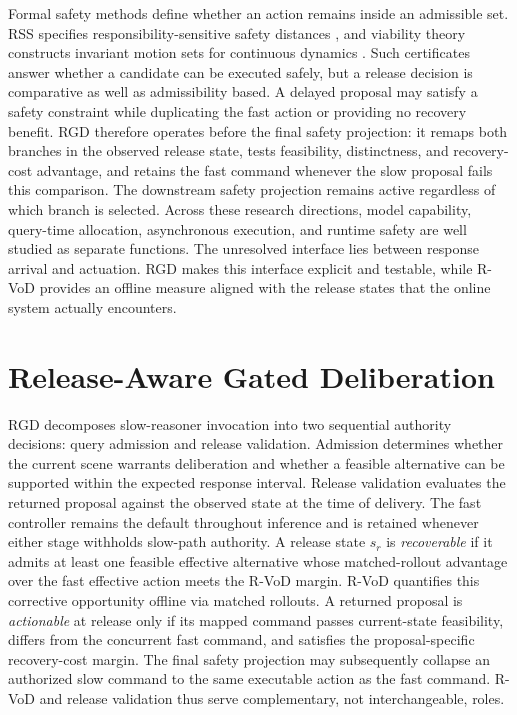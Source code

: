 \documentclass[letterpaper,journal]{IEEEtran}
\begin{document}
Formal safety methods define whether an action remains inside an admissible
set. RSS specifies responsibility-sensitive safety distances
\cite{shalevshwartz2017rss}, and viability theory constructs invariant motion
sets for continuous dynamics \cite{liniger2019viability}. Such certificates
answer whether a candidate can be executed safely, but a release decision is
comparative as well as admissibility based. A delayed proposal may satisfy a
safety constraint while duplicating the fast action or providing no recovery
benefit. RGD therefore operates before the final safety projection: it remaps
both branches in the observed release state, tests feasibility, distinctness,
and recovery-cost advantage, and retains the fast command whenever the slow
proposal fails this comparison. The downstream safety projection remains
active regardless of which branch is selected. Across these research directions, model capability, query-time allocation,
asynchronous execution, and runtime safety are well studied as separate
functions. The unresolved interface lies between response arrival and
actuation. RGD makes this interface explicit and testable, while R-VoD provides
an offline measure aligned with the release states that the online system
actually encounters.
\section{Release-Aware Gated Deliberation}
\label{sec:method}
RGD decomposes slow-reasoner invocation into two sequential authority decisions:
query admission and release validation. Admission determines whether the current
scene warrants deliberation and whether a feasible alternative can be supported
within the expected response interval. Release validation evaluates the returned
proposal against the observed state at the time of delivery. The fast controller
remains the default throughout inference and is retained whenever either stage
withholds slow-path authority. A release state $s_r$ is \emph{recoverable} if it admits at least one feasible
effective alternative whose matched-rollout advantage over the fast effective
action meets the R-VoD margin. R-VoD quantifies this corrective opportunity offline via
matched rollouts. A returned proposal is \emph{actionable} at release only if
its mapped command passes current-state feasibility, differs from the concurrent fast
command, and satisfies the proposal-specific recovery-cost margin. The final
safety projection may subsequently collapse an authorized slow command to the
same executable action as the fast command. R-VoD and release validation thus
serve complementary, not interchangeable, roles.
\end{document}
